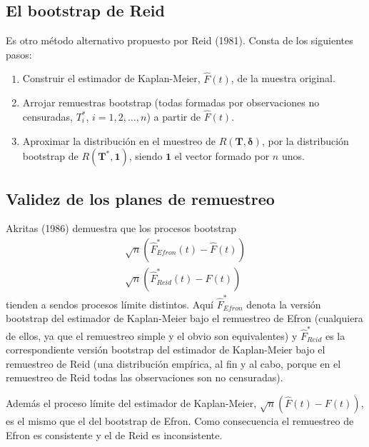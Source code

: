 \documentclass[
]{book}
\theoremstyle{break}
\theoremstyle{definition}
\theoremstyle{definition}
\theoremstyle{definition}
\theoremstyle{remark}
\begin{document}
\hypertarget{bootcen-reid}{%
\subsection{El bootstrap de Reid}\label{bootcen-reid}}

Es otro método alternativo propuesto por Reid (1981). Consta de los
siguientes pasos:

\begin{enumerate}
\def\labelenumi{\arabic{enumi}.}
\item
  Construir el estimador de Kaplan-Meier, \(\hat{F}\left( t \right)\),
  de la muestra original.
\item
  Arrojar remuestras bootstrap (todas formadas por observaciones no
  censuradas, \(T_i^{\ast}\), \(i=1,2,\ldots ,n\)) a partir de
  \(\hat{F}\left(t \right)\).
\item
  Aproximar la distribución en el muestreo de \(R\left( \mathbf{T},\boldsymbol{\delta} \right)\), por la
  distribución bootstrap de
  \(R\left( \mathbf{T}^{\ast},\mathbf{1} \right)\),
  siendo \(\mathbf{1}\) el vector formado
  por \(n\) unos.
\end{enumerate}

\hypertarget{validez-de-los-planes-de-remuestreo}{%
\subsection{Validez de los planes de remuestreo}\label{validez-de-los-planes-de-remuestreo}}

Akritas (1986) demuestra que los procesos bootstrap
\[\begin{aligned}
\sqrt{n}\left( \hat{F}^{\ast}_{Efron}\left( t \right) 
- \hat{F}\left( t \right) \right) \\ 
\sqrt{n}\left( \hat{F}^{\ast}_{Reid} \left( t \right) 
- \hat{F}\left( t \right) \right)
\end{aligned}\]
tienden a sendos procesos límite distintos. Aquí
\(\hat{F}^{\ast}_{Efron}\) denota la versión bootstrap del estimador
de Kaplan-Meier bajo el remuestreo de Efron (cualquiera de ellos, ya que
el remuestreo simple y el obvio son equivalentes) y
\(\hat{F}^{\ast}_{Reid}\) es la correspondiente versión bootstrap del
estimador de Kaplan-Meier bajo el remuestreo de Reid (una distribución
empírica, al fin y al cabo, porque en el remuestreo de Reid todas las
observaciones son no censuradas).

Además el proceso límite del estimador de Kaplan-Meier, \(\sqrt{n} \left( \hat{F}\left( t \right) -F\left( t \right) \right)\), es el mismo
que el del bootstrap de Efron. Como consecuencia el remuestreo de Efron
es consistente y el de Reid es inconsistente.
\end{document}
